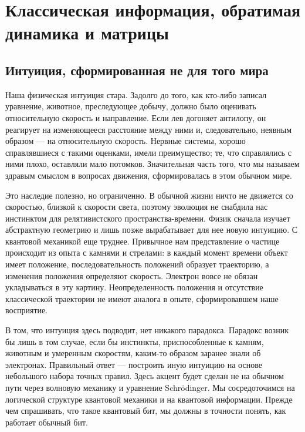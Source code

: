 \chapter{Классическая информация, обратимая динамика и матрицы}


\section{Интуиция, сформированная не для того мира}

Наша физическая интуиция стара. Задолго до того, как кто-либо записал уравнение, животное, преследующее добычу, должно было оценивать относительную скорость и направление. Если лев догоняет антилопу, он реагирует на изменяющееся расстояние между ними и, следовательно, неявным образом — на относительную скорость. Нервные системы, хорошо справлявшиеся с такими оценками, имели преимущество; те, что справлялись с ними плохо, оставляли мало потомков. Значительная часть того, что мы называем здравым смыслом в вопросах движения, сформировалась в этом обычном мире.

Это наследие полезно, но ограниченно. В обычной жизни ничто не движется со скоростью, близкой к скорости света, поэтому эволюция не снабдила нас инстинктом для релятивистского пространства-времени. Физик сначала изучает абстрактную геометрию и лишь позже вырабатывает для нее новую интуицию. С квантовой механикой еще труднее. Привычное нам представление о частице происходит из опыта с камнями и стрелами: в каждый момент времени объект имеет положение, последовательность положений образует траекторию, а изменения положения определяют скорость. Электрон вовсе не обязан укладываться в эту картину. Неопределенность положения и отсутствие классической траектории не имеют аналога в опыте, сформировавшем наше восприятие.

В том, что интуиция здесь подводит, нет никакого парадокса. Парадокс возник бы лишь в том случае, если бы инстинкты, приспособленные к камням, животным и умеренным скоростям, каким-то образом заранее знали об электронах. Правильный ответ — построить иную интуицию на основе небольшого набора точных правил. Здесь акцент будет сделан не на обычном пути через волновую механику и уравнение Schr\"odinger. Мы сосредоточимся на логической структуре квантовой механики и на квантовой информации. Прежде чем спрашивать, что такое квантовый бит, мы должны в точности понять, как работает обычный бит.

